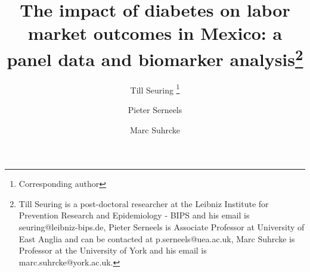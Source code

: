 \documentclass[12pt,english]{article}
\providecommand{\DIFaddbegin}{} %
\providecommand{\DIFaddend}{} %
\providecommand{\DIFdelbegin}{} %
\providecommand{\DIFdelend}{} %
\begin{document}
\title{The impact of diabetes on labor market outcomes in Mexico: a panel data and biomarker analysis\DIFaddbegin \thanks{Till Seuring is a post-doctoral researcher at the Leibniz Institute for Prevention Research and Epidemiology - BIPS and his email is seuring@leibniz-bips.de,  Pieter Serneels is Associate Professor at University of East Anglia and can be contacted at p.serneels@uea.ac.uk, Marc Suhrcke is Professor at the University of York and his email is marc.suhrcke@york.ac.uk.}\DIFaddend }

\DIFdelbegin %
\DIFdelend \DIFaddbegin \author[1,2]{\DIFaddend Till Seuring%
	\thanks{Corresponding author}}
\DIFdelbegin %
\DIFdelend \DIFaddbegin \author[2]{\DIFaddend Pieter Serneels}
\DIFdelbegin %
\DIFdelend \DIFaddbegin \author[3]{\DIFaddend Marc Suhrcke}

\DIFdelbegin %
\DIFdelend \DIFaddbegin {}
\DIFaddend 





\maketitle 
\DIFdelbegin %
\end{document}
